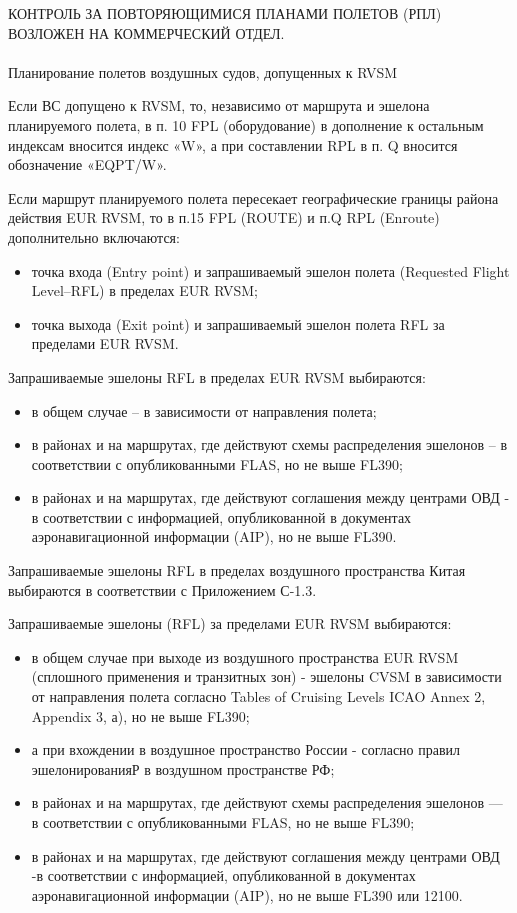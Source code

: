 КОНТРОЛЬ ЗА ПОВТОРЯЮЩИМИСЯ ПЛАНАМИ ПОЛЕТОВ (РПЛ) ВОЗЛОЖЕН НА КОММЕРЧЕСКИЙ ОТДЕЛ.

\paragraph{} Планирование полетов воздушных судов, допущенных к RVSM

Если ВС допущено к RVSM, то, независимо от маршрута и эшелона планируемого полета, в п. 10 FPL (оборудование) в дополнение к остальным индексам вносится индекс «W», а при составлении RPL в п. Q вносится обозначение «EQPT/W».

Если маршрут планируемого полета пересекает географические границы района действия EUR RVSM, то в п.15 FPL (ROUTE) и п.Q RPL (Enroute) дополнительно включаются:

\begin{itemize}
    \item точка входа (Entry point) и запрашиваемый эшелон полета (Requested Flight Level–RFL) в пределах EUR RVSM;
    \item точка выхода (Exit point) и запрашиваемый эшелон полета RFL за пределами EUR RVSM.
\end{itemize}

Запрашиваемые эшелоны RFL в пределах EUR RVSM выбираются:
\begin{itemize}
    \item в общем случае – в зависимости от направления полета;
    \item в районах и на маршрутах, где действуют схемы распределения эшелонов – в соответствии с опубликованными FLAS, но не выше FL390;
    \item в районах и на маршрутах, где действуют соглашения между центрами ОВД - в соответствии с информацией, опубликованной в документах аэронавигационной информации (AIP), но не выше FL390.
\end{itemize}

Запрашиваемые эшелоны RFL в пределах воздушного пространства Китая выбираются в соответствии с Приложением С-1.3.

Запрашиваемые эшелоны (RFL) за пределами EUR RVSM выбираются:

\begin{itemize}
    \item в общем случае при выходе из воздушного пространства EUR RVSM (сплошного применения и транзитных зон) - эшелоны CVSM в зависимости от направления полета согласно Tables of Cruising Levels ICAO Annex 2, Appendix 3, а), но не выше FL390;
    \item а при вхождении в воздушное пространство России - согласно правил эшелонированияР в воздушном пространстве РФ;
    \item в районах и на маршрутах, где действуют схемы распределения эшелонов — в соответствии с опубликованными FLAS, но не выше FL390;
    \item в районах и на маршрутах, где действуют соглашения между центрами ОВД -в соответствии с информацией, опубликованной в документах аэронавигационной информации (AIP), но не выше FL390 или 12100.
\end{itemize}
 
